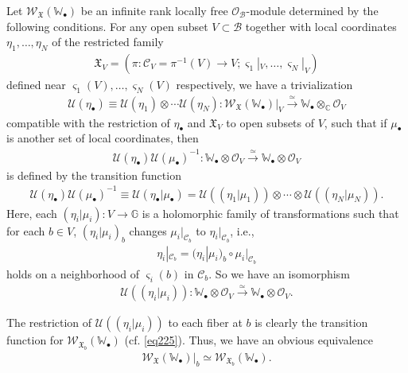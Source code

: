 \documentclass[12pt,a4paper,notitlepage]{article}
\theoremstyle{definition}
\theoremstyle{plain}
\newcommand{\fk}{\mathfrak}
\newcommand{\mc}{\mathcal}
\newcommand{\scr}{\mathscr}
\newcommand{\sgm}{\varsigma}
\newcommand{\blt}{\bullet}
\newcommand{\Wbb}{\mathbb W}
\newcommand{\Gbb}{\mathbb G}
\newcommand{\Cbb}{\mathbb C}
\numberwithin{equation}{section}
\begin{document}
Let $\scr W_{\fk X}(\Wbb_\blt)$ be an infinite rank locally free $\scr O_{\mc B}$-module \index{W@$\scr W(\Wbb_i)$, $\scr W_{\fk X}(\Wbb_\blt)$} determined by the following conditions. For any open subset $V\subset\mc B$ together with local coordinates $\eta_1,\dots,\eta_N$ of the restricted family \index{XV@$\fk X_V$}
\begin{align}
\fk X_V=(\pi:\mc C_V=\pi^{-1}(V)\rightarrow V;\sgm_1|_V,\dots,\sgm_N|_V)
\end{align}
defined near $\sgm_1(V),\dots,\sgm_N(V)$ respectively, we have a trivialization
\begin{align}
\mc U(\eta_\blt)\equiv \mc U(\eta_1)\otimes\cdots\mc U(\eta_N):\scr W_{\fk X}(\Wbb_\blt)|_V\xrightarrow{\simeq}\Wbb_\blt\otimes_\Cbb\scr O_V
\end{align}
compatible with the restriction of $\eta_\blt$ and $\fk X_V$ to open subsets of $V$, such that if $\mu_\blt$ is another set of local coordinates, then \index{U@$\mc U(\alpha),\mc U(\eta),\mc U(\eta_\blt)$}
\begin{align*}
\mc U(\eta_\blt)\mc U(\mu_\blt)^{-1}:\Wbb_\blt\otimes\scr O_V\xrightarrow{\simeq}\Wbb_\blt\otimes\scr O_V
\end{align*}
is defined by the transition function
\begin{align}
\mc U(\eta_\blt)\mc U(\mu_\blt)^{-1}\equiv \mc U(\eta_\blt|\mu_\blt)=\mc U((\eta_1|\mu_1))\otimes\cdots\otimes\mc U((\eta_N|\mu_N)).
\end{align}
Here, each $(\eta_i|\mu_i):V\rightarrow\Gbb$ is a holomorphic family of transformations such that for each $b\in V$, $(\eta_i|\mu_i)_b$ changes $\mu_i|_{\mc C_b}$ to $\eta_i|_{\mc C_b}$, i.e., 
\begin{align*}
\eta_i|_{\mc C_b}=(\eta_i|\mu_i)_b\circ \mu_i|_{\mc C_b}
\end{align*}
holds on a neighborhood of $\sgm_i(b)$ in $\mc C_b$. So we have an isomorphism
\begin{align*}
\mc U((\eta_i|\mu_i)):\Wbb_\blt\otimes\scr O_V\xrightarrow{\simeq}\Wbb_\blt\otimes\scr O_V.
\end{align*}


The restriction of $\mc U((\eta_i|\mu_i))$ to each fiber at $b$ is clearly the transition function for $\scr W_{\fk X_b}(\Wbb_\blt)$ (cf. \eqref{eq225}). Thus, we have an obvious equivalence
\begin{align}
\scr W_{\fk X}(\Wbb_\blt)\big|_b\simeq \scr W_{\fk X_b}(\Wbb_\blt).
\end{align}
\end{document}
